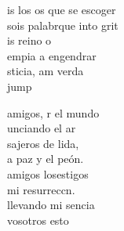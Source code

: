 \begin{cancion}[Id y enseñad][Garabaín]
	is los os que se escoger\\
	sois palabrque into grit\\
	is reino o       \\
	 empia a engendrar\\
	sticia, am verda\\jump\\
	\begin{chorus}%
	amigos, r el mundo\\
	unciando el ar\\
	sajeros de lida,\\
	a paz y el peón.\\
	amigos losestigos\\
	 mi resurreccn. \\
	llevando mi sencia\\
	vosotros esto\\
	\end{chorus}%
	\jump\\
\end{cancion}%
